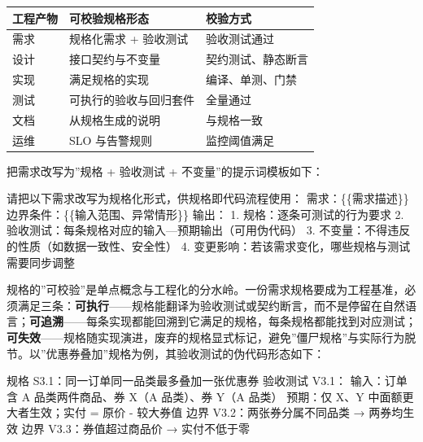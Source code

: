 \documentclass[12pt,a4paper,twoside,openany]{ctexbook}
\numberwithin{figure}{chapter}
\numberwithin{table}{chapter}
\newenvironment{Shaded}{}{}
\newcommand{\NormalTok}[1]{#1}
\newcounter{none}
\begin{document}
{\def\LTcaptype{none} %
\begin{longtable}[]{@{}lll@{}}
\toprule\noalign{}
工程产物 & 可校验规格形态 & 校验方式 \\
\midrule\noalign{}
\endhead
\bottomrule\noalign{}
\endlastfoot
需求 & 规格化需求 + 验收测试 & 验收测试通过 \\
设计 & 接口契约与不变量 & 契约测试、静态断言 \\
实现 & 满足规格的实现 & 编译、单测、门禁 \\
测试 & 可执行的验收与回归套件 & 全量通过 \\
文档 & 从规格生成的说明 & 与规格一致 \\
运维 & SLO 与告警规则 & 监控阈值满足 \\
\end{longtable}
}

把需求改写为''规格 + 验收测试 + 不变量''的提示词模板如下：

\begin{Shaded}
\begin{Highlighting}[]
\NormalTok{请把以下需求改写为规格化形式，供规格即代码流程使用：}
\NormalTok{需求：\{\{需求描述\}\}}
\NormalTok{边界条件：\{\{输入范围、异常情形\}\}}
\NormalTok{输出：}
\NormalTok{1. 规格：逐条可测试的行为要求}
\NormalTok{2. 验收测试：每条规格对应的输入—预期输出（可用伪代码）}
\NormalTok{3. 不变量：不得违反的性质（如数据一致性、安全性）}
\NormalTok{4. 变更影响：若该需求变化，哪些规格与测试需要同步调整}
\end{Highlighting}
\end{Shaded}

规格的''可校验''是单点概念与工程化的分水岭。一份需求规格要成为工程基准，必须满足三条：\textbf{可执行}------规格能翻译为验收测试或契约断言，而不是停留在自然语言；\textbf{可追溯}------每条实现都能回溯到它满足的规格，每条规格都能找到对应测试；\textbf{可失效}------规格随实现演进，废弃的规格显式标记，避免''僵尸规格''与实际行为脱节。以''优惠券叠加''规格为例，其验收测试的伪代码形态如下：

\begin{Shaded}
\begin{Highlighting}[]
\NormalTok{规格 S3.1：同一订单同一品类最多叠加一张优惠券}
\NormalTok{验收测试 V3.1：}
\NormalTok{  输入：订单含 A 品类两件商品、券 X（A 品类）、券 Y（A 品类）}
\NormalTok{  预期：仅 X、Y 中面额更大者生效；实付 = 原价 {-} 较大券值}
\NormalTok{  边界 V3.2：两张券分属不同品类 → 两券均生效}
\NormalTok{  边界 V3.3：券值超过商品价 → 实付不低于零}
\end{Highlighting}
\end{Shaded}
\end{document}
